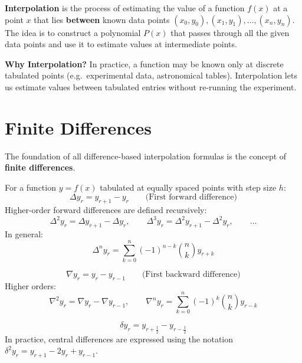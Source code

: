 \documentclass[12pt]{article}
\begin{document}
\begin{defbox}[Interpolation]
\textbf{Interpolation} is the process of estimating the value of a function $f(x)$ at a point $x$ that lies \textbf{between} known data points $(x_0,y_0),(x_1,y_1),\ldots,(x_n,y_n)$. The idea is to construct a polynomial $P(x)$ that passes through all the given data points and use it to estimate values at intermediate points.
\end{defbox}

\begin{keybox}
\textbf{Why Interpolation?} In practice, a function may be known only at discrete tabulated points (e.g.\ experimental data, astronomical tables). Interpolation lets us estimate values between tabulated entries without re-running the experiment.
\end{keybox}

\bigskip

\section{Finite Differences}

The foundation of all difference-based interpolation formulas is the concept of \textbf{finite differences}.

\begin{defbox}
For a function $y = f(x)$ tabulated at equally spaced points with step size $h$:
\[
  \Delta y_r = y_{r+1} - y_r \qquad \text{(First forward difference)}
\]
Higher-order forward differences are defined recursively:
\[
  \Delta^2 y_r = \Delta y_{r+1} - \Delta y_r, \qquad
  \Delta^3 y_r = \Delta^2 y_{r+1} - \Delta^2 y_r, \qquad \ldots
\]
In general:
\[
  \Delta^n y_r = \sum_{k=0}^{n}(-1)^{n-k}\binom{n}{k}y_{r+k}
\]
\end{defbox}

\begin{defbox}
\[
  \nabla y_r = y_r - y_{r-1} \qquad \text{(First backward difference)}
\]
Higher orders:
\[
  \nabla^2 y_r = \nabla y_r - \nabla y_{r-1}, \qquad
  \nabla^n y_r = \sum_{k=0}^{n}(-1)^k\binom{n}{k}y_{r-k}
\]
\end{defbox}

\begin{defbox}
\[
  \delta y_r = y_{r+\frac{1}{2}} - y_{r-\frac{1}{2}}
\]
In practice, central differences are expressed using the notation $\delta^2 y_r = y_{r+1} - 2y_r + y_{r-1}$.
\end{defbox}
\end{document}
